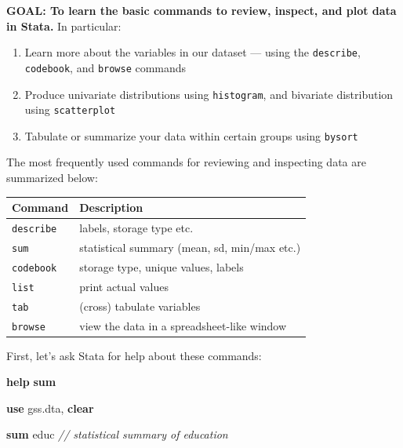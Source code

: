 \documentclass[
]{book}
\newenvironment{Shaded}{\begin{snugshade}}{\end{snugshade}}
\newcommand{\CommentTok}[1]{\textcolor[rgb]{0.56,0.35,0.01}{\textit{#1}}}
\newcommand{\KeywordTok}[1]{\textcolor[rgb]{0.13,0.29,0.53}{\textbf{#1}}}
\newcommand{\NormalTok}[1]{#1}
\providecommand{\tightlist}{%
  \setlength{\itemsep}{0pt}\setlength{\parskip}{0pt}}
\begin{document}
\begin{alert}

\textbf{GOAL: To learn the basic commands to review, inspect, and plot data in Stata.} In particular:

\begin{enumerate}
\def\labelenumi{\arabic{enumi}.}
\tightlist
\item
  Learn more about the variables in our dataset --- using the \texttt{describe}, \texttt{codebook}, and \texttt{browse} commands
\item
  Produce univariate distributions using \texttt{histogram}, and bivariate distribution using \texttt{scatterplot}
\item
  Tabulate or summarize your data within certain groups using \texttt{bysort}
\end{enumerate}

\end{alert}

The most frequently used commands for reviewing and inspecting data are summarized below:

\begin{longtable}[]{@{}ll@{}}
\toprule
Command & Description\tabularnewline
\midrule
\endhead
\texttt{describe} & labels, storage type etc.\tabularnewline
\texttt{sum} & statistical summary (mean, sd, min/max etc.)\tabularnewline
\texttt{codebook} & storage type, unique values, labels\tabularnewline
\texttt{list} & print actual values\tabularnewline
\texttt{tab} & (cross) tabulate variables\tabularnewline
\texttt{browse} & view the data in a spreadsheet-like window\tabularnewline
\bottomrule
\end{longtable}

First, let's ask Stata for help about these commands:

\begin{Shaded}
\begin{Highlighting}[]
\KeywordTok{help} \KeywordTok{sum}
\end{Highlighting}
\end{Shaded}

\begin{Shaded}
\begin{Highlighting}[]
\KeywordTok{use}\NormalTok{ gss.dta, }\KeywordTok{clear}

\KeywordTok{sum}\NormalTok{ educ }\CommentTok{// statistical summary of education}
\end{Highlighting}
\end{Shaded}
\end{document}
